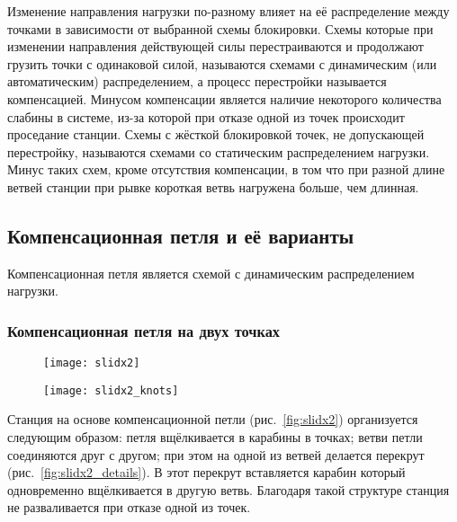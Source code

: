 \documentclass[fleqn, 12pt]{extarticle}
\begin{document}
    Изменение направления нагрузки по-разному влияет на её распределение между точками в зависимости от выбранной схемы блокировки. Схемы которые при изменении направления
    действующей силы перестраиваются и продолжают грузить точки с одинаковой силой, называются схемами с динамическим (или автоматическим) распределением, а процесс перестройки 
    называется компенсацией. Минусом компенсации является наличие некоторого количества слабины в системе, из-за которой при отказе одной из точек происходит проседание станции. 
    Схемы с жёсткой блокировкой точек, не допускающей перестройку, называются схемами со статическим распределением нагрузки. Минус таких схем, кроме отсутствия компенсации,
    в том что при разной длине ветвей станции при рывке короткая ветвь нагружена больше, чем длинная.

\subsection{Компенсационная петля и её варианты}
    Компенсационная петля является схемой с динамическим распределением нагрузки.
    
    \subsubsection{Компенсационная петля на двух точках}
    \begin{figure}[h]
        \centering
        \begin{minipage}[t]{0.45\textwidth}
            \texttt{[image: slidx2]}
            \label{fig:slidx2}
        \end{minipage}\hspace{0.05\textwidth}
        \begin{minipage}[t]{0.45\textwidth}
            \texttt{[image: slidx2\_knots]}
            \label{fig:slidx2_knots}
        \end{minipage}
    \end{figure}
    
    Станция на основе компенсационной петли (рис.~\ref{fig:slidx2}) организуется следующим образом: петля вщёлкивается в карабины в точках; ветви петли соединяются друг с другом;
    при этом на одной из ветвей делается перекрут (рис.~\ref{fig:slidx2_details}). В этот перекрут вставляется карабин который одновременно вщёлкивается в другую ветвь.
    Благодаря такой структуре станция не разваливается при отказе одной из точек. 
    
\end{document}
